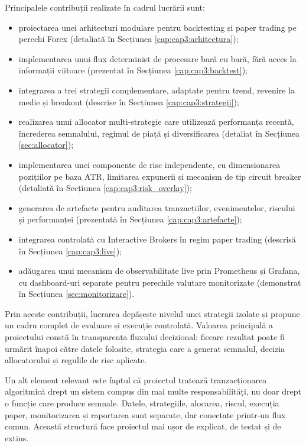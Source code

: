 Principalele contribuții realizate în cadrul lucrării sunt:
\begin{itemize}
    \item proiectarea unei arhitecturi modulare pentru backtesting și paper trading pe perechi Forex (detaliată în Secțiunea \ref{cap:cap3:arhitectura});
    \item implementarea unui flux determinist de procesare bară cu bară, fără acces la informații viitoare (prezentat în Secțiunea \ref{cap:cap3:backtest});
    \item integrarea a trei strategii complementare, adaptate pentru trend, revenire la medie și breakout (descrise în Secțiunea \ref{cap:cap3:strategii});
    \item realizarea unui allocator multi-strategie care utilizează performanța recentă, încrederea semnalului, regimul de piață și diversificarea (detaliat în Secțiunea \ref{sec:allocator});
    \item implementarea unei componente de risc independente, cu dimensionarea pozițiilor pe baza ATR, limitarea expunerii și mecanism de tip circuit breaker (detaliată în Secțiunea \ref{cap:cap3:risk_overlay});
    \item generarea de artefacte pentru auditarea tranzacțiilor, evenimentelor, riscului și performanței (prezentată în Secțiunea \ref{cap:cap3:artefacte});
    \item integrarea controlată cu Interactive Brokers în regim paper trading (descrisă în Secțiunea \ref{cap:cap3:live});
    \item adăugarea unui mecanism de observabilitate live prin Prometheus și Grafana, cu dashboard-uri separate pentru perechile valutare monitorizate (demonstrat în Secțiunea \ref{sec:monitorizare}).
\end{itemize}

Prin aceste contribuții, lucrarea depășește nivelul unei strategii izolate și propune un cadru complet de evaluare și execuție controlată. Valoarea principală a proiectului constă în transparența fluxului decizional: fiecare rezultat poate fi urmărit înapoi către datele folosite, strategia care a generat semnalul, decizia allocatorului și regulile de risc aplicate.

Un alt element relevant este faptul că proiectul tratează tranzacționarea algoritmică drept un sistem compus din mai multe responsabilități, nu doar drept o funcție care produce semnale. Datele, strategiile, alocarea, riscul, execuția paper, monitorizarea și raportarea sunt separate, dar conectate printr-un flux comun. Această structură face proiectul mai ușor de explicat, de testat și de extins.

